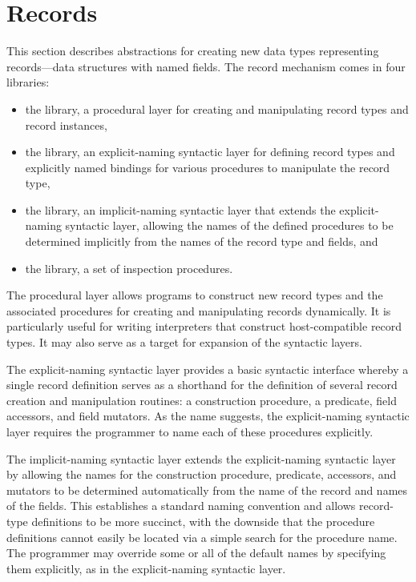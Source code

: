 \chapter{Records}
\label{recordschapter}
This section describes abstractions for creating new data types
representing records---data structures with named fields. The record
mechanism comes in four libraries:

\begin{itemize}
\item the  library,
  a procedural layer for creating and manipulating record types and record
  instances,
\item the  library,
  an explicit-naming syntactic layer for defining record types and
  explicitly named bindings for various procedures to manipulate the record
  type,
\item the  library,
  an implicit-naming syntactic layer that extends the explicit-naming
  syntactic layer, allowing the names of the defined procedures to be
  determined implicitly from the names of the record type and fields, and
\item the  library,
  a set of inspection procedures.
\end{itemize}
% 
The procedural layer allows programs to construct new record types
and the associated procedures for creating and manipulating records
dynamically.
It is particularly useful for writing interpreters that construct
host-compatible record types.  It may also serve as a target for expansion
of the syntactic layers.

The explicit-naming syntactic layer provides a basic syntactic interface
whereby a single record definition serves as a shorthand for the definition of
several record creation and manipulation routines: a construction procedure, a
predicate, field accessors, and field mutators. As the name suggests, the
explicit-naming syntactic layer requires the programmer to name each of these
procedures explicitly.

The implicit-naming syntactic layer extends the explicit-naming syntactic layer
by allowing the names for the construction procedure, predicate, accessors, and
mutators to be determined automatically from the name of the record and names
of the fields. This establishes a standard naming convention and allows
record-type definitions to be more succinct, with the downside that the
procedure
definitions cannot easily be located via a simple search for the 
procedure name.
The programmer may override some or all of the default names by specifying them
explicitly, as in the explicit-naming syntactic layer.

